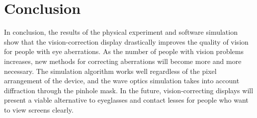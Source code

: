 \chapter{Conclusion}

In conclusion, the results of the physical experiment and software simulation show that the vision-correction display drastically improves the quality of vision for people with eye aberrations. As the number of people with vision problems increases, new methods for correcting aberrations will become more and more necessary. The simulation algorithm works well regardless of the pixel arrangement of the device, and the wave optics simulation takes into account diffraction through the pinhole mask. In the future, vision-correcting displays will present a viable alternative to eyeglasses and contact lesses for people who want to view screens clearly.
